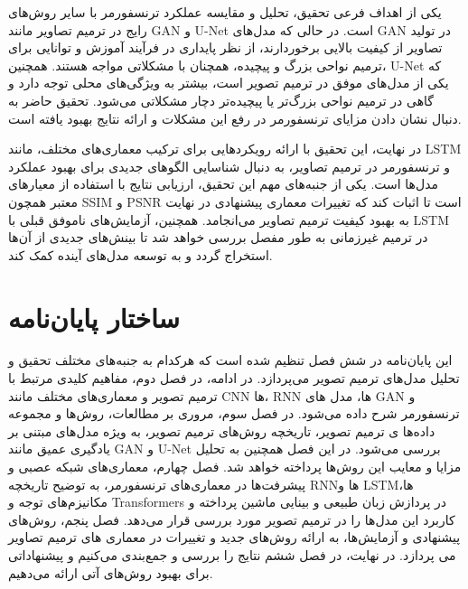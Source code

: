 یکی از اهداف فرعی تحقیق، تحلیل و مقایسه عملکرد ترنسفورمر با سایر روش‌های رایج در ترمیم تصاویر مانند GAN و U-Net است. در حالی که مدل‌های GAN در تولید تصاویر از کیفیت بالایی برخوردارند، از نظر پایداری در فرآیند آموزش و توانایی برای ترمیم نواحی بزرگ و پیچیده، همچنان با مشکلاتی مواجه هستند. همچنین، U-Net که یکی از مدل‌های موفق در ترمیم تصویر است، بیشتر به ویژگی‌های محلی توجه دارد و گاهی در ترمیم نواحی بزرگ‌تر یا پیچیده‌تر دچار مشکلاتی می‌شود. تحقیق حاضر به دنبال نشان دادن مزایای ترنسفورمر در رفع این مشکلات و ارائه نتایج بهبود یافته است.

در نهایت، این تحقیق با ارائه رویکردهایی برای ترکیب معماری‌های مختلف، مانند LSTM و ترنسفورمر در ترمیم تصاویر، به دنبال شناسایی الگوهای جدیدی برای بهبود عملکرد مدل‌ها است. یکی از جنبه‌های مهم این تحقیق، ارزیابی نتایج با استفاده از معیارهای معتبر همچون SSIM و PSNR است تا اثبات کند که تغییرات معماری پیشنهادی در نهایت به بهبود کیفیت ترمیم تصاویر می‌انجامد. همچنین، آزمایش‌های ناموفق قبلی با LSTM در ترمیم غیرزمانی به طور مفصل بررسی خواهد شد تا بینش‌های جدیدی از آن‌ها استخراج گردد و به توسعه مدل‌های آینده کمک کند.


\section{ساختار پایان‌نامه}

این پایان‌نامه در شش فصل تنظیم شده است که هرکدام به جنبه‌های مختلف تحقیق و تحلیل مدل‌های ترمیم تصویر می‌پردازد. در ادامه، در فصل دوم، مفاهیم کلیدی مرتبط با ترمیم تصویر و معماری‌های مختلف مانند CNN ها، RNN ها،‌ مدل های GAN و ترنسفورمر شرح داده می‌شود. در فصل سوم، مروری بر مطالعات، روش‌ها و مجموعه داده‌ها
ی ترمیم تصویر، تاریخچه روش‌های ترمیم تصویر، به ویژه مدل‌های مبتنی بر یادگیری عمیق مانند GAN و U-Net بررسی می‌شود. در این فصل همچنین به تحلیل مزایا و معایب این روش‌ها پرداخته خواهد شد. فصل چهارم، معماری‌های شبکه عصبی و پیشرفت‌ها در معماری‌های ترنسفورمر، به توضیح تاریخچه RNNها و LSTMها، مکانیزم‌های توجه و Transformers در پردازش زبان طبیعی و بینایی ماشین پرداخته و کاربرد این مدل‌ها را در ترمیم تصویر مورد بررسی قرار می‌دهد. فصل پنجم، روش‌های پیشنهادی و آزمایش‌ها، به ارائه روش‌های جدید و تغییرات در معماری های ترمیم تصاویر می پردازد. در نهایت، در فصل ششم نتایج را بررسی و جمع‌بندی می‌کنیم و پیشنهاداتی برای بهبود روش‌های آتی ارائه می‌دهیم.